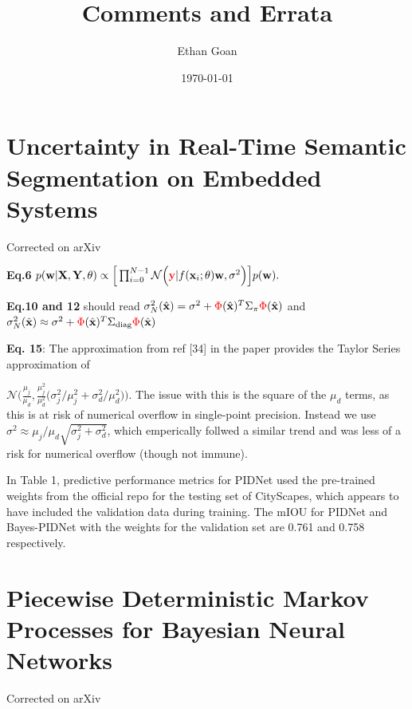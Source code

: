 \documentclass{article}
\title{{\titlefont Comments and Errata}}
\author{{\authorfont Ethan Goan}}
\date{\small \today}
\begin{document}
\maketitle
\tableofcontents


\section{Uncertainty in Real-Time Semantic Segmentation on Embedded Systems}
Corrected on arXiv

\textbf{Eq.6}  $ p(\mathbf{w} | \mathbf{X}, \mathbf{Y} , \theta ) \propto \Big[\prod_{i=0}^{N-1}\mathcal{N}\Big({\color{red}\mathbf{y}}|f(\mathbf{x}_{i};\theta) \mathbf{w}, \sigma^{2}\Big)\Big] p(\mathbf{w}).$

\textbf{Eq.10 and 12} should read $\sigma^{2}_{N}(\hat{\mathbf{x}}) =
\sigma^{2} + {\color{red} \Phi}(\hat{\mathbf{x}})^{T}\Sigma_{\pi}{\color{red} \Phi}(\hat{\mathbf{x}})$ and
$\sigma^{2}_{N}(\hat{\mathbf{x}}) \approx \sigma^{2} +
{\color{red}\Phi}(\hat{\mathbf{x}})^{T}\Sigma_{\text{diag}}{\color{red}\Phi}(\hat{\mathbf{x}})$

\textbf{Eq. 15}: The approximation from ref [34] in the paper provides the Taylor Series approximation of

$ \mathcal{N}\Big(\frac{\mu_{j}}{\mu_{d}},\frac{\mu_{j}^{2}}{\mu_{d}^{2}}\big(\sigma^{2}_{j} / \mu_{j}^{2} +  \sigma^{2}_{d} / \mu_{d}^{2} \big)\Big)$. The issue with this is the square of the $\mu_{d}$ terms, as this is at risk of numerical overflow in single-point precision. Instead we use $\sigma^{2} \approx \mu_{j} / \mu_{d}\sqrt{\sigma^{2}_{j} + \sigma^{2}_{d}}$, which emperically follwed a similar trend and was less of a risk for numerical overflow (though not immune).

In Table 1, predictive performance metrics for PIDNet used the pre-trained weights from the official repo for the testing set of CityScapes, which appears to have included the validation data during training. The mIOU for PIDNet and Bayes-PIDNet with the weights for the validation set are 0.761 and 0.758 respectively.

\vspace*{1cm}
\section{Piecewise Deterministic Markov Processes for Bayesian Neural Networks}
Corrected on arXiv
\end{document}
